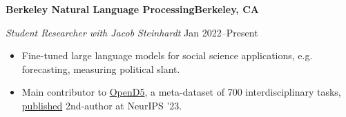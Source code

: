 \textbf{Berkeley Natural Language Processing\hfill Berkeley, CA}\par
\textit{Student Researcher with Jacob Steinhardt} \hfill Jan 2022--Present\par
\begin{itemize}
	\item Fine-tuned large language models for social science applications, e.g. forecasting, measuring political slant.
	\item Main contributor to \href{https://github.com/petezh/OpenD5}{OpenD5}, a meta-dataset of 700 interdisciplinary tasks, \href{https://arxiv.org/abs/2302.14233}{published} 2nd-author at NeurIPS '23.
\end{itemize} \par